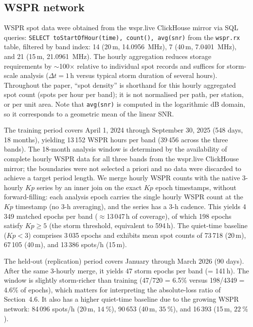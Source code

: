\documentclass{agujournal2019}
\begin{document}
\subsection{WSPR network}

{\sloppy
WSPR spot data were obtained from the wspr.live ClickHouse mirror via SQL
queries: \texttt{SELECT toStartOfHour(time), count(), avg(snr)} from the
\texttt{wspr.rx} table, filtered by band index: 14 (20\,m,
\SI{14.0956}{MHz}), 7 (40\,m, \SI{7.0401}{MHz}), and 21 (15\,m,
\SI{21.0961}{MHz}). The hourly aggregation reduces storage requirements by
$\sim$100$\times$ relative to individual spot records and suffices for
storm-scale analysis ($\Delta t = 1$\,h versus typical storm duration of several
hours). Throughout the paper, ``spot density'' is shorthand for this hourly
aggregated spot count (spots per hour per band); it is not normalised per
path, per station, or per unit area. Note that \texttt{avg(snr)} is computed
in the logarithmic dB domain, so it corresponds to a geometric mean of the
linear SNR.
\par}

The training period covers April 1, 2024 through September 30, 2025
(548 days, 18 months), yielding 13\,152 WSPR hours per band
(39\,456 across the three bands). The 18-month analysis window is
determined by the availability of complete hourly WSPR data for all
three bands from the wspr.live ClickHouse mirror; the boundaries were
not selected a priori and no data were discarded to achieve a target
period length. We merge hourly WSPR counts with the native 3-hourly
$Kp$ series by an inner join on the exact $Kp$ epoch timestamps,
without forward-filling: each analysis epoch carries the single
hourly WSPR count at the $Kp$ timestamp (no 3-h averaging), and the
series has a 3-h cadence. This yields 4\,349 matched epochs per band
($\approx$13\,047\,h of
coverage), of which 198 epochs satisfy $Kp \ge 5$ (the storm
threshold, equivalent to 594\,h). The quiet-time baseline ($Kp < 3$)
comprises 3\,035 epochs and exhibits mean spot counts of 73\,718
(20\,m), 67\,105 (40\,m), and 13\,386 spots/h (15\,m).

The held-out (replication) period covers January through March 2026 (90 days).
After the same 3-hourly merge, it yields 47 storm epochs per band
(= 141\,h). The window is slightly storm-richer than training
(47/720 = 6.5\% versus 198/4349 = 4.6\% of epochs), which matters for
interpreting the absolute-loss ratio of Section~4.6. It also has a higher
quiet-time baseline due to the growing WSPR
network: 84\,096 spots/h
(20\,m, $\SI{+14}{\percent}$), 90\,653 (40\,m, $\SI{+35}{\percent}$),
and 16\,393 (15\,m, $\SI{+22}{\percent}$).
\end{document}
